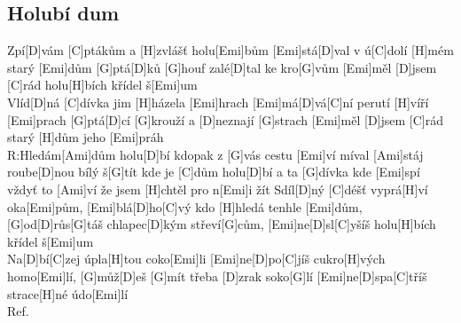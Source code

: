 \documentclass[10pt]{article}
\begin{document}
\begin{Large}
\begin{minipage}{\textwidth}
\subsection{Holubí dum}
\begin{multicols}{2}
\begin{guitar}
	[Emi]Zpí[D]vám [C]ptákům a [H]zvlášť holu[Emi]bům
	[Emi]stá[D]val v ú[C]dolí [H]mém starý [Emi]dům
	[G]ptá[D]ků [G]houf zalé[D]tal ke kro[G]vům
	[Emi]měl [D]jsem [C]rád holu[H]bích křídel š[Emi]um
	\\
	[Emi]Vlíd[D]ná [C]dívka jim [H]házela [Emi]hrach
	[Emi]má[D]vá[C]ní perutí [H]víří [Emi]prach
	[G]ptá[D]cí [G]krouží a [D]neznají [G]strach
	[Emi]měl [D]jsem [C]rád starý [H]dům jeho [Emi]práh
	\\
	R:Hledám[Ami]dům holu[D]bí
	kdopak z [G]vás cestu [Emi]ví
	míval [Ami]stáj roube[D]nou bílý š[G]tít
	kde je [C]dům holu[D]bí a ta [G]dívka kde [Emi]spí
	vždyť to [Ami]ví že jsem [H]chtěl pro n[Emi]i žít
	\columnbreak
	[Emi]Sdíl[D]ný [C]déšť vyprá[H]ví oka[Emi]pům,
	[Emi]blá[D]ho[C]vý kdo [H]hledá tenhle [Emi]dům,
	[G]od[D]růs[G]táš chlapec[D]kým střeví[G]cům,
	[Emi]ne[D]sl[C]yšíš holu[H]bích křídel š[Emi]um
	\\
	[Emi]Na[D]bí[C]zej úpla[H]tou coko[Emi]li
	[Emi]ne[D]po[C]jíš cukro[H]vých homo[Emi]lí,
	[G]můž[D]eš [G]mít třeba [D]zrak soko[G]lí
	[Emi]ne[D]spa[C]tříš strace[H]né údo[Emi]lí
	\\
	Ref.
\end{guitar}
\end{multicols}
\end{minipage}


\end{Large}
\end{document}
